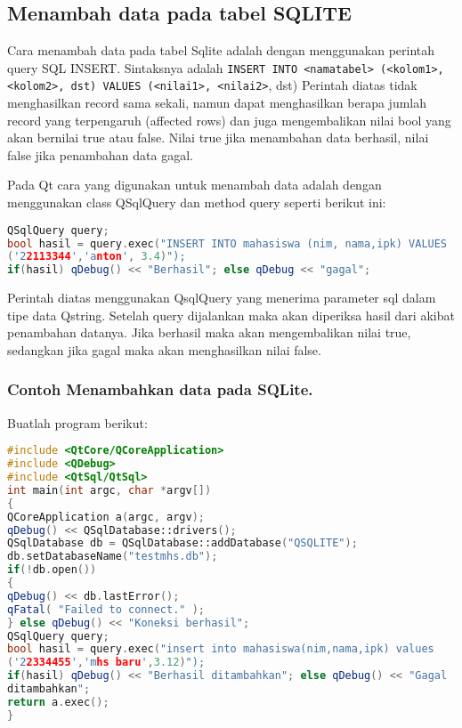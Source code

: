 \subsection{Menambah data pada tabel
SQLITE}\label{menambah-data-pada-tabel-sqlite}

Cara menambah data pada tabel Sqlite adalah dengan menggunakan perintah
query SQL INSERT. Sintaksnya adalah
\texttt{INSERT\ INTO\ \textless{}namatabel\textgreater{}\ (\textless{}kolom1\textgreater{},\textless{}kolom2\textgreater{},\ dst)\ VALUES\ (\textless{}nilai1\textgreater{},\ \textless{}nilai2\textgreater{}},
dst) Perintah diatas tidak menghasilkan record sama sekali, namun dapat
menghasilkan berapa jumlah record yang terpengaruh (affected rows) dan
juga mengembalikan nilai bool yang akan bernilai true atau false. Nilai
true jika menambahan data berhasil, nilai false jika penambahan data
gagal.

Pada Qt cara yang digunakan untuk menambah data adalah dengan
menggunakan class QSqlQuery dan method query seperti berikut ini:

\begin{lstlisting}[language=c++, numbers=none]
QSqlQuery query;
bool hasil = query.exec("INSERT INTO mahasiswa (nim, nama,ipk) VALUES
('22113344','anton', 3.4)");
if(hasil) qDebug() << "Berhasil"; else qDebug << "gagal";
\end{lstlisting}

Perintah diatas menggunakan QsqlQuery yang menerima parameter sql dalam
tipe data Qstring. Setelah query dijalankan maka akan diperiksa hasil
dari akibat penambahan datanya. Jika berhasil maka akan mengembalikan
nilai true, sedangkan jika gagal maka akan menghasilkan nilai false.

\subsubsection*{Contoh  Menambahkan data pada SQLite.}

Buatlah program berikut:

\begin{lstlisting}[language=c++, caption= Menambahkan data pada SQLite]
#include <QtCore/QCoreApplication>
#include <QDebug>
#include <QtSql/QtSql>
int main(int argc, char *argv[])
{
QCoreApplication a(argc, argv);
qDebug() << QSqlDatabase::drivers();
QSqlDatabase db = QSqlDatabase::addDatabase("QSQLITE");
db.setDatabaseName("testmhs.db");
if(!db.open())
{
qDebug() << db.lastError();
qFatal( "Failed to connect." );
} else qDebug() << "Koneksi berhasil";
QSqlQuery query;
bool hasil = query.exec("insert into mahasiswa(nim,nama,ipk) values
('22334455','mhs baru',3.12)");
if(hasil) qDebug() << "Berhasil ditambahkan"; else qDebug() << "Gagal
ditambahkan";
return a.exec();
}
\end{lstlisting}

